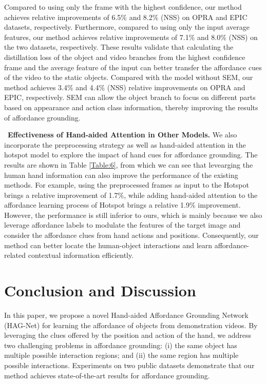 \documentclass[journal,twoside]{IEEEtran}
\newcommand{\myPara}[1]{\vspace{5pt}\noindent~\textbf{#1} \quad}
\begin{document}
\par Compared to using only the frame with the highest confidence, our method achieves relative improvements of 6.5\% and 8.2\% (NSS) on OPRA and EPIC datasets, respectively. Furthermore, compared to using only the input average features, our method achieves relative improvements of 7.1\% and 8.0\% (NSS) on the two datasets, respectively. These results validate that calculating the distillation loss of the object and video branches from the highest confidence frame and the average feature of the input can better transfer the affordance cues of the video to the static objects. Compared with the model without SEM, our method achieves 3.4\% and 4.4\% (NSS) relative improvements on OPRA and EPIC, respectively. SEM can allow the object branch to focus on different parts based on appearance and action class information, thereby improving the results of affordance grounding.

\myPara{Effectiveness of Hand-aided Attention in Other Models.} We also incorporate the preprocessing strategy as well as hand-aided attention in the hotspot \cite{interaction-hotspots} model to explore the impact of hand cues for affordance grounding. The results are shown in Table \ref{Table:6}, from which we can see that levearging the human hand information can also improve the performance of the existing methods. For example, using the preprocessed frames as input to the Hotspot brings a relative improvement of 1.7\%, while adding hand-aided attention to the affordance learning process of Hotspot brings a relative 1.9\% improvement. However, the performance is still inferior to ours, which is mainly because we also leverage affordance labels to modulate the features of the target image and consider the affordance clues from hand actions and positions. Consequently, our method can better locate the human-object interactions and learn affordance-related contextual information efficiently.

\section{Conclusion and Discussion}

In this paper, we propose a novel Hand-aided Affordance Grounding Network (HAG-Net) for learning the affordance of objects from demonstration videos. By leveraging the clues offered by the position and action of the hand, we address two challenging problems in affordance grounding: (i) the same object has multiple possible interaction regions; and (ii) the same region has multiple possible interactions. Experiments on two public datasets demonstrate that our method achieves state-of-the-art results for affordance grounding.
\end{document}
